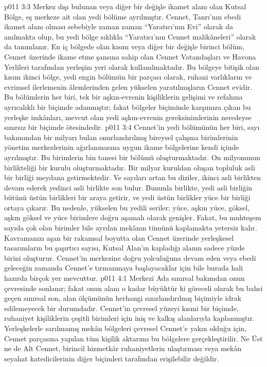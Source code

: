 \vs p011 3:3 Merkez dışı bulunan veya diğer bir değişle ikamet alanı olan Kutsal Bölge, eş merkeze ait olan yedi bölüme ayrılmıştır. Cennet, Tanrı’nın ebedi ikamet alanı olması sebebiyle zaman zaman “Yaratıcı’nın Evi” olarak da anılmakta olup, bu yedi bölge sıklıkla “Yaratıcı’nın Cennet malikâneleri” olarak da tanımlanır. En iç bölgede olan kısım veya diğer bir değişle birinci bölüm, Cennet üzerinde ikame etme şansına sahip olan Cennet Vatandaşları ve Havona Yerlileri tarafından yerleşim yeri olarak kullanılmaktadır. Bu bölgeye bitişik olan kısım ikinci bölge, yedi engin bölümün bir parçası olarak, ruhani varlıkların ve evrimsel ilerlemenin âlemlerinden gelen yükselen yaratılmışların Cennet evidir. Bu bölümlerin her biri, tek bir aşkın\hyp{}evrenin kişiliklerin gelişimi ve refahına ayrıcalıklı bir biçimde adanmıştır; fakat bölgeler biçiminde karşımıza çıkan bu yerleşke imkânları, mevcut olan yedi aşkın\hyp{}evrenin gereksinimlerinin neredeyse sınırsız bir biçimde ötesindedir.
\vs p011 3:4 Cennet’in yedi bölümünün her biri, sayı bakımından bir milyarı bulan onurlandırılmış bireysel çalışma birimlerinin yönetim merkezlerinin ağırlanmasına uygun ikame bölgelerine kendi içinde ayrılmıştır. Bu birimlerin bin tanesi bir bölümü oluşturmaktadır. On milyonunun birlikteliği bir kurulu oluşturmaktadır. Bir milyar kuruldan oluşan topluluk asli bir birliği meydana getirmektedir. Ve sayıları artan bu diziler, ikinci asli birlikten devam ederek yedinci asli birlikte son bulur. Bununla birlikte, yedi asli birliğin bütünü üstün birlikleri bir araya getirir, ve yedi üstün birlikler yüce bir birliği ortaya çıkarır. Bu nedenle, yükselen bu yedili seriler; yüce, aşkın yüce, göksel, aşkın göksel ve yüce birimlere doğru aşamalı olarak genişler. Fakat, bu muhteşem sayıda çok olan birimler bile ayrılan mekânın tümünü kaplamakta yetersiz kalır. Kavramanızı aşan bir rakamsal boyutta olan Cennet üzerinde yerleşkesel tasarımların bu şaşırtıcı sayısı, Kutsal Alan’ın kapladığı alanın sadece yüzde birini oluşturur. Cennet’in merkezine doğru yolculuğuna devam eden veya ebedi geleceğin zamanda Cennet’e tırmanmaya başlayacaklar için bile burada hali hazırda birçok yer mevcuttur.
\vs p011 4:1 Merkezi Ada sınırsal bakımdan onun çevresinde sonlanır; fakat onun alanı o kadar büyüktür ki göreceli olarak bu bahsi geçen sınırsal son, alan ölçümünün herhangi sınırlandırılmış biçimiyle idrak edilemeyecek bir durumdadır. Cennet’in çevresel yüzeyi kısmi bir biçimde, ruhaniyet kişiliklerin çeşitli birimleri için iniş ve kalkış alanlarıyla kaplanmıştır. Yerleşkelerle sarılmamış mekân bölgeleri çevresel Cennet’e yakın olduğu için, Cennet parçasına yapılan tüm kişilik aktarımı bu bölgelere gerçekleştirilir. Ne Üst ne de Alt Cennet, birincil hizmetkâr ruhaniyetlerin ulaştırması veya mekân seyahat katedicilerinin diğer biçimleri tarafından erişilebilir değildir.
